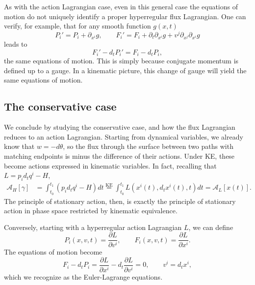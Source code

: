 \documentclass[nofootinbib,aps,pre]{revtex4-2}
\begin{document}
As with the action Lagrangian case, even in this general case the equations of motion do not uniquely identify a proper hyperregular flux Lagrangian. One can verify, for example, that for any smooth function $g(x,t)$
\begin{equation}
	P_i'=P_i+\partial_{x^i}g,
	\qquad
	F_i'=F_i+\partial_t\partial_{x^i}g
	+v^j\partial_{x^j}\partial_{x^i}g
\end{equation}
leads to
\begin{equation}	F_i'-d_tP_i'=F_i-d_tP_i,
\end{equation}
the same equations of motion. This is simply because conjugate momentum is defined up to a gauge. In a kinematic picture, this change of gauge will yield the same equations of motion.

\subsection{The conservative case}

We conclude by studying the conservative case, and how the flux Lagrangian reduces to an action Lagrangian. Starting from dynamical variables, we already know that $w=-d\theta$, so the flux through the
surface between two paths with matching endpoints is minus the difference of their actions.
Under KE, these become actions expressed in kinematic variables. In fact, recalling that $L = p_i d_t q^i - H$,
\begin{equation}
	\begin{aligned}
		\mathcal{A}_H[\gamma] 
		&= \int_{t_0}^{t_1} ( p_i d_t q^i - H) dt  \stackrel{\text{KE}}{=} \int_{t_0}^{t_1} L(x^i(t), d_t x^i(t), t) dt = \mathcal{A}_L[x(t)].
	\end{aligned}
\end{equation}
The principle of stationary action, then, is exactly the principle of stationary action in phase space restricted by kinematic equivalence.

Conversely, starting with a hyperregular action Lagrangian $L$, we can define
\begin{equation}
	P_i(x,v,t)=\frac{\partial L}{\partial v^i},
	\qquad
	F_i(x,v,t)=\frac{\partial L}{\partial x^i}.
\end{equation}
The equations of motion become
\begin{equation}
	F_i-d_tP_i
	=
	\frac{\partial L}{\partial x^i}
	-
	d_t\frac{\partial L}{\partial v^i}
	=0,
	\qquad v^i=d_tx^i,
\end{equation}
which we recognize as the Euler-Lagrange equations.
\end{document}
